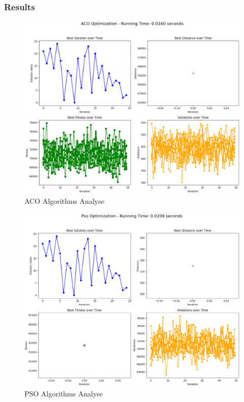 \subsubsection{Results}
\begin{figure}[h]
    \centering
    \includegraphics[width=1\linewidth]{figures/Aco_Results.PNG}
    \caption{ACO Algorithms Analyse}
    \label{fig:ACO Algorithms Analyse}
\end{figure}
\begin{figure}[h]
    \centering
    \includegraphics[width=1\linewidth]{figures/Pso_Results.PNG}
    \caption{PSO Algorithms Analyse}
    \label{fig:PSO Algorithms Analyse}
\end{figure}



